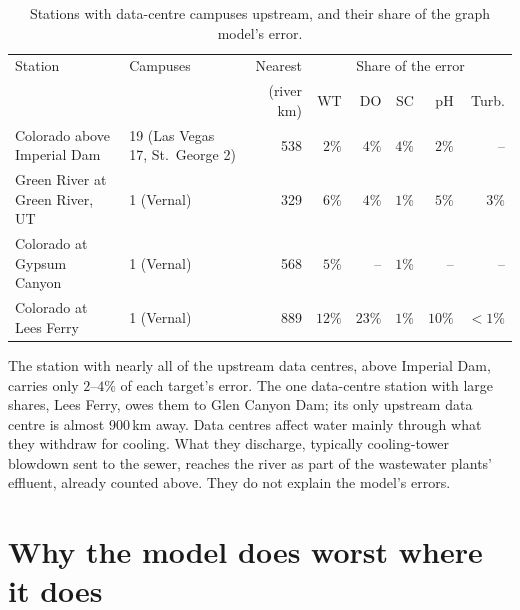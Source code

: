 \documentclass[11pt]{article}
\begin{document}
\begin{table}[H]
\centering
\small
\caption{Stations with data-centre campuses upstream, and their share of the graph model's error.}
\label{tab:dc}
\footnotesize\setlength{\tabcolsep}{4pt}
\begin{tabular}{l l r rrrrr}
\toprule
Station & Campuses & Nearest & \multicolumn{5}{c}{Share of the error} \\
        &          & (river km) & WT & DO & SC & pH & Turb. \\
\midrule
Colorado above Imperial Dam     & 19 (Las Vegas 17, St.~George 2) & 538 & $2\%$ & $4\%$ & $4\%$ & $2\%$ & -- \\
Green River at Green River, UT  & 1 (Vernal)                      & 329 & $6\%$ & $4\%$ & $1\%$ & $5\%$ & $3\%$ \\
Colorado at Gypsum Canyon       & 1 (Vernal)                      & 568 & $5\%$ & -- & $1\%$ & -- & -- \\
Colorado at Lees Ferry          & 1 (Vernal)                      & 889 & $12\%$ & $23\%$ & $1\%$ & $10\%$ & $<1\%$ \\
\bottomrule
\end{tabular}
\end{table}

The station with nearly all of the upstream data centres, above Imperial Dam, carries only
$2$--$4\%$ of each target's error. The one data-centre station with large shares, Lees Ferry, owes
them to Glen Canyon Dam; its only upstream data centre is almost 900\,km away. Data centres affect
water mainly through what they withdraw for cooling. What they discharge, typically cooling-tower
blowdown sent to the sewer, reaches the river as part of the wastewater plants' effluent, already
counted above. They do not explain the model's errors.

\section{Why the model does worst where it does}\label{sec:why}
\end{document}
